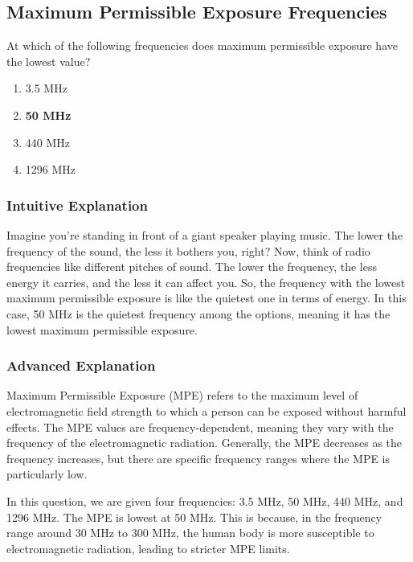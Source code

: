 \subsection{Maximum Permissible Exposure Frequencies}
\label{T0C02}

\begin{tcolorbox}[colback=gray!10!white,colframe=black!75!black,title=T0C02]
At which of the following frequencies does maximum permissible exposure have the lowest value?
\begin{enumerate}[label=\Alph*)]
    \item 3.5 MHz
    \item \textbf{50 MHz}
    \item 440 MHz
    \item 1296 MHz
\end{enumerate}
\end{tcolorbox}

\subsubsection{Intuitive Explanation}
Imagine you're standing in front of a giant speaker playing music. The lower the frequency of the sound, the less it bothers you, right? Now, think of radio frequencies like different pitches of sound. The lower the frequency, the less energy it carries, and the less it can affect you. So, the frequency with the lowest maximum permissible exposure is like the quietest one in terms of energy. In this case, 50 MHz is the quietest frequency among the options, meaning it has the lowest maximum permissible exposure.

\subsubsection{Advanced Explanation}
Maximum Permissible Exposure (MPE) refers to the maximum level of electromagnetic field strength to which a person can be exposed without harmful effects. The MPE values are frequency-dependent, meaning they vary with the frequency of the electromagnetic radiation. Generally, the MPE decreases as the frequency increases, but there are specific frequency ranges where the MPE is particularly low.

In this question, we are given four frequencies: 3.5 MHz, 50 MHz, 440 MHz, and 1296 MHz. The MPE is lowest at 50 MHz. This is because, in the frequency range around 30 MHz to 300 MHz, the human body is more susceptible to electromagnetic radiation, leading to stricter MPE limits. 

